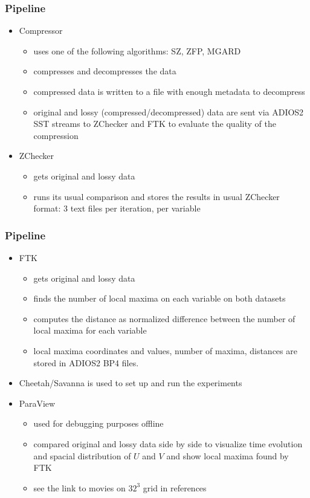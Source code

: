 \begin{frame}[fragile]
  \frametitle{Pipeline}
  \begin{itemize}
  \item Compressor
    \begin{itemize}
    \item uses one of the following algorithms: SZ, ZFP, MGARD
    \item compresses and decompresses the data
    \item compressed data is written to a file with enough metadata to decompress
    \item original and lossy (compressed/decompressed) data are sent via ADIOS2 SST streams to ZChecker and FTK to evaluate the quality of the compression
    \end{itemize}
  \item ZChecker
    \begin{itemize}
    \item gets original and lossy data
    \item runs its usual comparison and stores the results in usual ZChecker format: 3 text files per iteration, per variable
    \end{itemize}
  \end{itemize}
\end{frame}

    
\begin{frame}[fragile]
  \frametitle{Pipeline}
  \begin{itemize}
  \item FTK
    \begin{itemize}
    \item gets original and lossy data
    \item finds the number of local maxima on each variable on both datasets
    \item computes the distance as normalized difference between the number of local maxima for each variable
    \item local maxima coordinates and values, number of maxima, distances are stored in ADIOS2 BP4 files.
    \end{itemize}
  \item Cheetah/Savanna is used to set up and run the experiments
  \item ParaView
    \begin{itemize}
    \item used for debugging purposes offline
    \item compared original and lossy data side by side to visualize time evolution and spacial distribution of $U$ and $V$
      and show local maxima found by FTK
    \item see the link to movies on $32^3$ grid in references
    \end{itemize}
  \end{itemize}
\end{frame}

    
